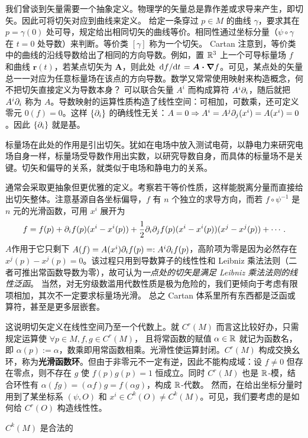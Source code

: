 我们曾谈到矢量需要一个抽象定义。物理学的矢量总是靠作差或求导来产生，即切矢。因此可将切矢对应到曲线来定义。
给定一条穿过 $p\in M$ 的曲线 $\gamma$，要求其在 $p=\gamma(0)$ 处可导，规定给出相同切矢的曲线等价。相同性通过坐标分量（$\psi\circ\gamma$ 在 $t=0$ 处导数）来判断。等价类 $[\gamma]$ 称为一个切矢。
Cartan 注意到，等价类中的曲线的沿线导数给出了相同的方向导数。例如，置 $\mathbb{R}^3$ 上一个可导标量场 $f$ 和曲线 $\bm r(t)$，若某点切矢为 $\bm A$，则此处 $\dv*{f}{t}=\vb*{A\cdot\nabla} f$。可见，某点处的矢量总一一对应为任意标量场在该点的方向导数。数学又常常使用映射来构造概念，何不把切矢直接定义为导数本身？
可以联合矢量 $A^i$ 而构成算符 $A^i\partial_i$，随后就把 $A^i\partial_i$ 称为 $A$。导数映射的运算性质构造了线性空间：可相加，可数乘，还可定义零元 $0(f)=0$。这样 $\{\partial_i\}$ 的确线性无关：$A=0\Rightarrow A^i=A^j\partial_j(x^i)=A(x^i)=0$。因此 $\{\partial_i\}$ 就是基。

标量场在此处的作用是引出切矢。犹如在电场中放入测试电荷，以静电力来研究电场自身一样，标量场受导数作用出实数，以研究导数自身，而具体的标量场不是关键。切矢和偏导的关系，就类似于电场和静电力的关系。

通常会采取更抽象但更优雅的定义。考察若干等价性质，这样能脱离分量而直接给出切矢整体。注意基源自各坐标偏导，$f$ 有 $n$ 个独立的求导方向，而若 $f\circ\psi^{-1}$ 是 $n$ 元的光滑函数，可用 $x^i$ 展开为
\[
    f=f(p)+\partial_i f(p)(x^i-x^i(p))+ \frac 12\partial_i\partial_j f(p)(x^i-x^i(p))(x^j-x^j(p))+\cdots.
\]
$A$作用于它只剩下 $A(f)=A(x^i)\partial_i f(p)=:A^i\partial_i f(p)$，高阶项为零是因为必然存在 $x^j(p)-x^j(p)=0$。该过程只用到导数算子的线性性和 Leibniz 乘法法则（二者可推出常函数导数为零），故可认为\textit{一点处的切矢是满足 Leibniz 乘法法则的线性泛函}。
当然，对无穷级数滥用代数性质是极为危险的，我们更倾向于考虑有限项相加，其次不一定要求标量场光滑。
总之 Cartan 体系里所有东西都是泛函或算符，甚至是更多层嵌套。

这说明切矢定义在线性空间乃至一个代数上。就 $C^r(M)$ 而言这比较好办，只需规定运算使 $\forall p\in M,f,g\in C^r(M)$，
且将常函数的赋值 $\alpha\in\mathbb{R}$ 就记为函数名，即 $\alpha(p):=\alpha$，数乘即用常函数相乘。光滑性使运算封闭。$C^r(M)$ 构成交换幺环，称为\textbf{光滑函数环}。但由于非零元不一定有逆，因此不能构成域：设 $f\ne 0$ 但存在零点，则不存在 $g$ 使 $f(p)g(p)=1$ 恒成立。同时 $C^r(M)$ 也是 $\mathbb{R}$-模，结合环性有 $\alpha(fg)=(\alpha f) g=f(\alpha g)$，构成 $\mathbb{R}$-代数。
然而，在给出坐标分量时用到了某坐标系 $(\psi,O)$ 和 $x^i\in C^k(O)\ne C^k(M)$。可见，我们要考虑的是如何给 $C^r(O)$ 构造线性性。

$C^k(M)$ 是合法的





